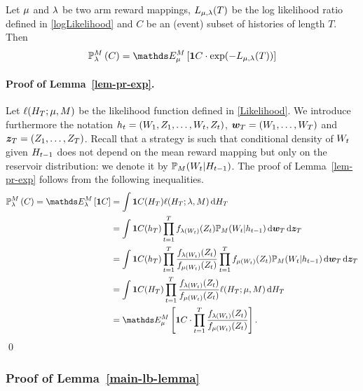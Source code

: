 \begin{lemma}\label{lem-pr-exp}
Let $\mu$ and $\lambda$ be two arm reward mappings,
$L_{\mu,\lambda}(T)$ be the log likelihood ratio defined in \eqref{logLikelihood}
and $C$ be an (event) subset of histories of length $T$.
Then
\begin{align*}
\PrAltModel{C}
	= \ETrueModel{ \1{C} \cdot \exp(-L_{\ArmMean,\ArmMeanAlt}(T)) }
\end{align*}
\end{lemma}

\paragraph{Proof of Lemma~\ref{lem-pr-exp}.}
Let $\ell(H_T ;\mu,M)$ be the likelihood function defined in \eqref{Likelihood}.
We introduce furthermore the notation $h_t = (W_1,Z_1,\dots,W_t,Z_t)$, $\bm {w}_T=(W_1,\dots,W_T)$ and $\bm z_T =(Z_1,\dots,Z_T)$. Recall that a strategy is such that conditional density of $W_t$ given $H_{t-1}$ does not depend on the mean reward mapping but only on the reservoir distribution: we denote it by $\mathbb{P}_M(W_t | H_{t-1})$.
The proof of Lemma~\ref{lem-pr-exp} follows from the following inequalities. 
\begin{align*}
\PrAltModel{C} =
  \EAltModel{ \1{C} }
 & =  \int \1{C}(\historyRV_T) \ell(\historyRV_T; \ArmMeanAlt, \ArmMeasure) \diff \historyRV_T \\
 & = \int \1{C}(h_T)
 \prod_{t=1}^Tf_{\ArmMeanAlt(\armRV_t)}(\rewardRV_t)
 \PrNone_\ArmMeasure(\armRV_t | h_{t-1}) \diff \bm \arm_T  \diff \bm z_T \\
 & = \int \1{C}(h_T)
 	\prod_{t=1}^T\frac{f_{\ArmMeanAlt(\armRV_t)}(\rewardRV_t)}{f_{\ArmMean(\armRV_t)}(\rewardRV_t)} \prod_{t=1}^T f_{\ArmMean(\armRV_t)}(\rewardRV_t)
 \PrNone_{\ArmMeasure}(\armRV_t | h_{t-1}) \diff \bm \arm_T \diff \bm z_T \\
  & = \int \1{C}(H_T) \prod_{t=1}^T\frac{f_{\ArmMeanAlt(\armRV_t)}(\rewardRV_t)}{f_{\ArmMean(\armRV_t)}(\rewardRV_t)} \ell(\historyRV_T;\ArmMean,\ArmMeasure) \diff \historyRV_T  \\
  & = \ETrueModel{
 \1{C} \cdot\prod_{t=1}^{T} \frac{ f_{\ArmMeanAlt(\armRV_t)}(\rewardRV_t) }{ f_{\ArmMean(\armRV_t)}(\rewardRV_t) } }.
\end{align*}
\qed



\subsubsection{Proof of Lemma~\ref{main-lb-lemma}}

